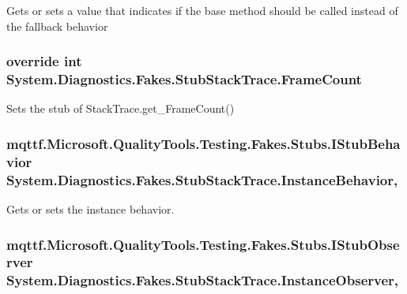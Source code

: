Gets or sets a value that indicates if the base method should be called instead of the fallback behavior

\hypertarget{class_system_1_1_diagnostics_1_1_fakes_1_1_stub_stack_trace_ac049d805f26abe6294fc4d3a980acbbd}{
\subsubsection[{Frame\-Count}]{\setlength{\rightskip}{0pt plus 5cm}override int System.\-Diagnostics.\-Fakes.\-Stub\-Stack\-Trace.\-Frame\-Count\hspace{0.3cm}{\ttfamily [get]}}}\label{class_system_1_1_diagnostics_1_1_fakes_1_1_stub_stack_trace_ac049d805f26abe6294fc4d3a980acbbd}


Sets the stub of Stack\-Trace.\-get\-\_\-\-Frame\-Count()

\hypertarget{class_system_1_1_diagnostics_1_1_fakes_1_1_stub_stack_trace_a21e423b37c0fb010b56dbdcece2ff623}{
\subsubsection[{Instance\-Behavior}]{\setlength{\rightskip}{0pt plus 5cm}mqttf.\-Microsoft.\-Quality\-Tools.\-Testing.\-Fakes.\-Stubs.\-I\-Stub\-Behavior System.\-Diagnostics.\-Fakes.\-Stub\-Stack\-Trace.\-Instance\-Behavior\hspace{0.3cm}{\ttfamily [get]}, {\ttfamily [set]}}}\label{class_system_1_1_diagnostics_1_1_fakes_1_1_stub_stack_trace_a21e423b37c0fb010b56dbdcece2ff623}


Gets or sets the instance behavior.

\hypertarget{class_system_1_1_diagnostics_1_1_fakes_1_1_stub_stack_trace_a07b22f54072a6bb7b54e4dd6215e0023}{
\subsubsection[{Instance\-Observer}]{\setlength{\rightskip}{0pt plus 5cm}mqttf.\-Microsoft.\-Quality\-Tools.\-Testing.\-Fakes.\-Stubs.\-I\-Stub\-Observer System.\-Diagnostics.\-Fakes.\-Stub\-Stack\-Trace.\-Instance\-Observer\hspace{0.3cm}{\ttfamily [get]}, {\ttfamily [set]}}}\label{class_system_1_1_diagnostics_1_1_fakes_1_1_stub_stack_trace_a07b22f54072a6bb7b54e4dd6215e0023}



